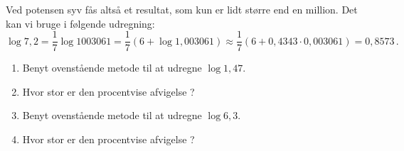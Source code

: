 \documentclass[12pt,oneside,a4paper]{article}
\theoremstyle{plain}
\begin{document}
Ved potensen syv fås altså et resultat, som kun er lidt større end en million.
Det kan vi bruge i følgende udregning:
\[
    \log 7,2 = \frac17 \log 1003061 = \frac17(6+\log1,003061)
    \approx \frac17(6+0,4343\cdot0,003061) = 0,8573 \,.
\]

\begin{enumerate}[label=(\alph*), resume]
    \item Benyt ovenstående metode til at udregne $\log 1,47$.
    \item Hvor stor er den procentvise afvigelse ?
    \item Benyt ovenstående metode til at udregne $\log 6,3$.
    \item Hvor stor er den procentvise afvigelse ?
\end{enumerate}
\end{document}
